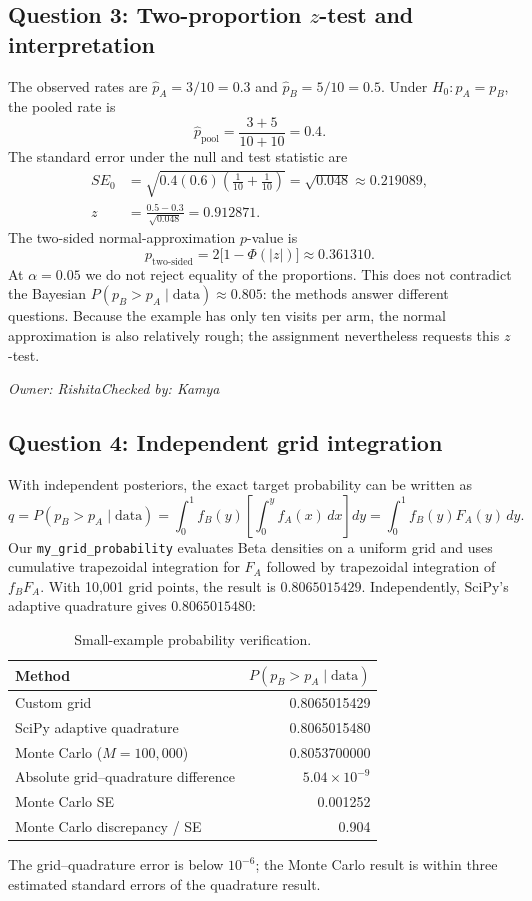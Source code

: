 \documentclass[11pt]{article}
\newcommand{\signoff}[2]{\par\smallskip\noindent\textit{Owner: #1\quad Checked by: #2}\par}
\begin{document}
\subsection{Question 3: Two-proportion $z$-test and interpretation}
The observed rates are $\hat p_A=3/10=0.3$ and $\hat p_B=5/10=0.5$. Under $H_0:p_A=p_B$, the pooled rate is
\[
\hat p_{\mathrm{pool}}=\frac{3+5}{10+10}=0.4.
\]
The standard error under the null and test statistic are
\begin{align*}
SE_0&=\sqrt{0.4(0.6)\left(\frac1{10}+\frac1{10}\right)}=\sqrt{0.048}\approx0.219089,\\
z&=\frac{0.5-0.3}{\sqrt{0.048}}=\boxed{0.912871}.
\end{align*}
The two-sided normal-approximation $p$-value is
\[
\boxed{p_{\mathrm{two\text{-}sided}}=2\bigl[1-\Phi(|z|)\bigr]\approx0.361310}.
\]
At $\alpha=0.05$ we do not reject equality of the proportions. This does not contradict the Bayesian $P(p_B>p_A\mid\text{data})\approx0.805$: the methods answer different questions. Because the example has only ten visits per arm, the normal approximation is also relatively rough; the assignment nevertheless requests this $z$-test.

\signoff{Rishita}{Kamya}

\subsection{Question 4: Independent grid integration}
With independent posteriors, the exact target probability can be written as
\[
q=P(p_B>p_A\mid\text{data})
=\int_0^1 f_B(y)\left[\int_0^y f_A(x)\,dx\right]dy
=\int_0^1 f_B(y)F_A(y)\,dy.
\]
Our \texttt{my\_grid\_probability} evaluates Beta densities on a uniform grid and uses cumulative trapezoidal integration for $F_A$ followed by trapezoidal integration of $f_BF_A$. With 10,001 grid points, the result is $0.8065015429$. Independently, SciPy's adaptive quadrature gives $0.8065015480$:
\begin{table}[H]\centering
\caption{Small-example probability verification.}
\begin{tabular}{lr}\toprule
Method & $P(p_B>p_A\mid\mathrm{data})$\\\midrule
Custom grid & 0.8065015429\\
SciPy adaptive quadrature & 0.8065015480\\
Monte Carlo ($M=100{,}000$) & 0.8053700000\\
Absolute grid--quadrature difference & $5.04\times10^{-9}$\\
Monte Carlo SE & 0.001252\\
Monte Carlo discrepancy / SE & 0.904\\\bottomrule
\end{tabular}
\end{table}
The grid--quadrature error is below $10^{-6}$; the Monte Carlo result is within three estimated standard errors of the quadrature result.
\end{document}
